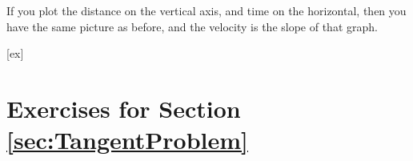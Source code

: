 If you plot the distance on the vertical axis, and time on the horizontal, then
you have the same picture as before, and the velocity is the slope of that graph. 


%


%


[ex]
\section*{Exercises for Section \ref{sec:TangentProblem}}

